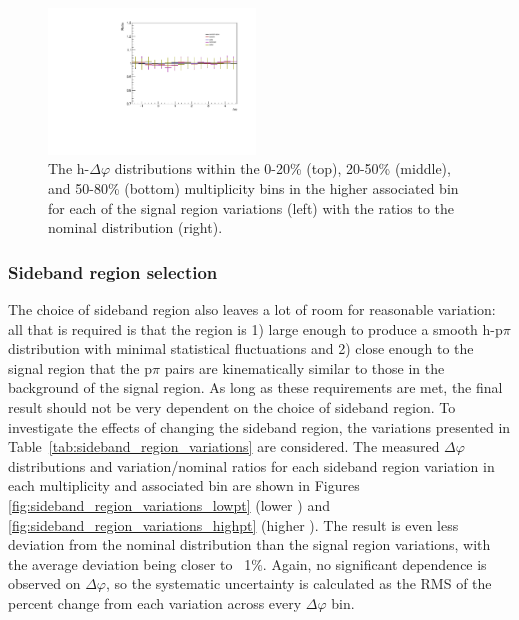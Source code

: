 \begin{figure}[ht]
    \includegraphics[width=0.49\textwidth]{figures/analysis/signal_variations_dphi_50_80_highpt_ratio.pdf}
    \caption{The h-\lmb $\Delta\varphi$ distributions within the 0-20\% (top), 20-50\% (middle), and 50-80\% (bottom) multiplicity bins in the higher associated \pt bin for each of the signal region variations (left) with the ratios to the nominal distribution (right).}
    \label{fig:signal_region_variations_highpt}
\end{figure}

\subsubsection{Sideband region selection}
The choice of sideband region also leaves a lot of room for reasonable variation: all that is required is that the region is 1) large enough to produce a smooth h-p$\pi$ distribution with minimal statistical fluctuations and 2) close enough to the signal region that the p$\pi$ pairs are kinematically similar to those in the background of the signal region. As long as these requirements are met, the final result should not be very dependent on the choice of sideband region. To investigate the effects of changing the sideband region, the variations presented in Table~\ref{tab:sideband_region_variations} are considered. The measured $\Delta\varphi$ distributions and variation/nominal ratios for each sideband region variation in each multiplicity and associated \pt bin are shown in Figures \ref{fig:sideband_region_variations_lowpt} (lower \pt) and \ref{fig:sideband_region_variations_highpt} (higher \pt). The result is even less deviation from the nominal distribution than the signal region variations, with the average deviation being closer to ~1\%. Again, no significant dependence is observed on $\Delta\varphi$, so the systematic uncertainty is calculated as the RMS of the percent change from each variation across every $\Delta\varphi$ bin.

